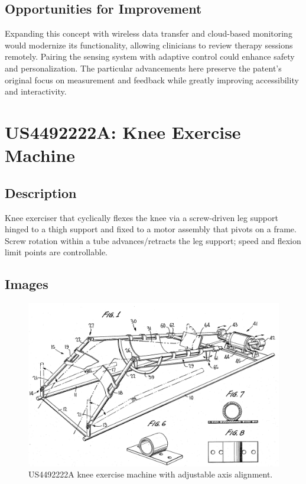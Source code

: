 \documentclass[11pt]{article}
\begin{document}
\subsection{Opportunities for Improvement}
Expanding this concept with wireless data transfer and cloud-based monitoring would modernize its functionality, allowing clinicians to review therapy sessions remotely. Pairing the sensing system with adaptive control could enhance safety and personalization. The particular advancements here preserve the patent's original focus on measurement and feedback while greatly improving accessibility and interactivity.

\section{US4492222A: Knee Exercise Machine}
\subsection{Description}
Knee exerciser that cyclically flexes the knee via a screw-driven leg support hinged to a thigh support and fixed to a motor assembly that pivots on a frame. Screw rotation within a tube advances/retracts the leg support; speed and flexion limit points are controllable.
\subsection{Images}
\begin{figure}[H]
  \centering
  \includegraphics[width=0.54\linewidth]{4492222A_1.png}
  \caption{US4492222A knee exercise machine with adjustable axis alignment.}
  \label{fig:US4492222A}
\end{figure}
\end{document}
